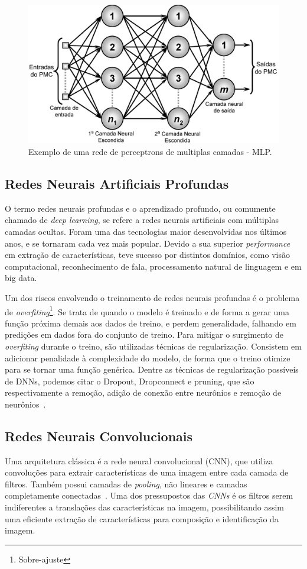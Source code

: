 \begin{figure}[!ht]
    \centering
    \includegraphics[width=0.9\columnwidth]{
        Imagens/RedeNeural.PNG
    }
    \caption{Exemplo de uma rede de perceptrons de multiplas camadas - MLP.}
    \label{fig:ann}
\end{figure}
\subsection{Redes Neurais Artificiais Profundas}\label{sec:Cap2_redes_neurais_profundas}
O termo redes neurais profundas e o aprendizado profundo, ou comumente chamado de \textit{deep learning}, se refere a redes neurais artificiais com múltiplas camadas ocultas. Foram uma das tecnologias maior desenvolvidas nos últimos anos, e se tornaram cada vez mais popular. Devido a sua superior \textit{performance} em extração de características, teve sucesso por distintos domínios, como visão computacional, reconhecimento de fala, processamento natural de linguagem e em big data.

Um dos riscos envolvendo o treinamento de redes neurais profundas é o problema de \textit{overfiting}\footnote{Sobre-ajuste}. Se trata de quando o modelo é treinado e de forma a gerar uma função próxima demais aos dados de treino, e perdem generalidade, falhando em predições em dados fora do conjunto de treino. Para mitigar o surgimento de \textit{overfiting} durante o treino, são utilizadas técnicas de regularização. Consistem em adicionar penalidade à complexidade do modelo, de forma que o treino otimize para se tornar uma função genérica. Dentre as técnicas de regularização possíveis de DNNs, podemos citar o Dropout, Dropconnect e pruning, que são respectivamente a remoção, adição de conexão entre neurônios e remoção de neurônios~\cite{hastie01statisticallearning}.


\subsection{Redes Neurais Convolucionais}\label{sec:Cap2_redes_neurais_convolucionais}
Uma arquitetura clássica é a rede neural convolucional (CNN), que utiliza convoluções para extrair características de uma imagem entre cada camada de filtros. Também possui camadas de \textit{pooling}, não lineares e camadas completamente conectadas~\cite{8308186}. Uma dos pressupostos das \textit{CNNs} é os filtros serem indiferentes a translações das características na imagem, possibilitando assim uma eficiente extração de características para composição e identificação da imagem.


